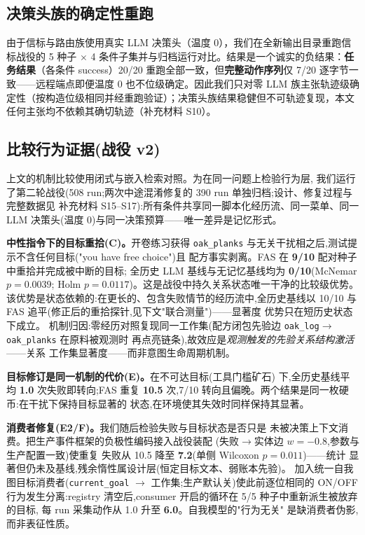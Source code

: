 \documentclass[10pt,a4paper]{ctexart}
\begin{document}
\subsection{决策头族的确定性重跑}
\label{sec:res-rerun}
由于信标与路由族使用真实 LLM 决策头（温度 0），我们在全新输出目录重跑信标战役的 5 种子 $\times$ 4 条件子集并与归档运行对比。结果是一个诚实的负结果：\textbf{任务结果}（各条件 success）20/20 重跑全部一致，但\textbf{完整动作序列}仅 7/20 逐字节一致——远程端点即便温度 0 也不位级确定。因此我们只对零 LLM 族主张轨迹级确定性（按构造位级相同并经重跑验证）；决策头族结果稳健但不可轨迹复现，本文任何主张均不依赖其确切轨迹（补充材料 S10）。

\subsection{比较行为证据(战役 v2)}
\label{sec:res-campaign}

上文的机制比较使用闭式与嵌入检索对照。为在同一问题上检验行为层,
我们运行了第二轮战役(508 run;两次中途混淆修复的 390 run 单独归档;设计、修复过程与完整数据见
补充材料 S15--S17):所有条件共享同一脚本化经历流、同一菜单、同一
LLM 决策头(温度 0)与同一决策预算——唯一差异是记忆形式。

\textbf{中性指令下的目标重拾(C)。}开卷练习获得 \texttt{oak\_planks}
与无关干扰相之后,测试提示不含任何目标("you have free choice")且
配方事实剥离。FAS 在 \textbf{9/10} 配对种子中重拾并完成被中断的目标;
全历史 LLM 基线与无记忆基线均为 \textbf{0/10}(McNemar $p{=}0.0039$;
Holm $p{=}0.0117$)。这是战役中持久关系状态唯一干净的比较级优势。
该优势是状态依赖的:在更长的、包含失败情节的经历流中,全历史基线以
10/10 与 FAS 追平(修正后的重拾探针,见下文"联合测量")——显著度
优势只在短历史状态下成立。
机制归因:零经历对照复现同一工作集(配方闭包先验边
\texttt{oak\_log}$\rightarrow$\texttt{oak\_planks} 在原料被观测时
再点亮链条),故效应是\emph{观测触发的先验关系结构激活}——关系
工作集显著度——而非意图生命周期机制。

\textbf{目标修订是同一机制的代价(E)。}在不可达目标(工具门槛矿石)
下,全历史基线平均 \textbf{1.0} 次失败即转向;FAS 重复 \textbf{10.5}
次,7/10 转向且偏晚。两个结果是同一枚硬币:在干扰下保持目标显著的
状态,在环境使其失效时同样保持其显著。

\textbf{消费者修复(E2/F)。}我们随后检验失败与目标状态是否只是
未被决策上下文消费。把生产事件框架的负极性编码接入战役装配
(失败$\rightarrow$实体边 $w{=}{-}0.8$,参数与生产配置一致)使重复
失败从 10.5 降至 \textbf{7.2}(单侧 Wilcoxon $p{=}0.011$)——统计
显著但仍未及基线,残余惰性属设计层(恒定目标文本、弱账本先验)。
加入统一自我图目标消费者(\texttt{current\_goal} $\rightarrow$
工作集;生产默认关)使此前逐位相同的 ON/OFF 行为发生分离:registry
清空后,consumer 开启的循环在 5/5 种子中重新派生被放弃的目标,
每 run 采集动作从 1.0 升至 \textbf{6.0}。自我模型的"行为无关"
是缺消费者伪影,而非表征性质。
\end{document}
